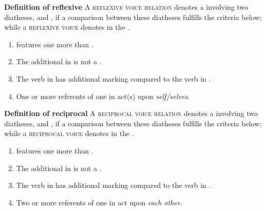 \eanoraggedright
		\textbf{Definition of reflexive} \newline
		A \textsc{reflexive voice relation} denotes a  involving two diatheses,  and , if a comparison between these diatheses fulfills the criteria below; while a \textsc{reflexive voice} denotes  in the .
		\begin{enumerate}[label=\roman*)]
			\item {} features one  more than .
			\item The additional  in  is not a .
			\item The verb in  has additional marking compared to the verb in .
			\item One or more referents of one  in  act(s) upon \textit{self/selves}.
		\end{enumerate}
	\z

\eanoraggedright
		\textbf{Definition of reciprocal} \newline
		A \textsc{reciprocal voice relation} denotes a  involving two diatheses,  and , if a comparison between these diatheses fulfills the criteria below; while a \textsc{reciprocal voice} denotes  in the .
		\begin{enumerate}[label=\roman*)]
			\item {} features one  more than .
			\item The additional  in  is not a .
			\item The verb in  has additional marking compared to the verb in .
			\item Two or more referents of one  in  act upon \textit{each other}.
		\end{enumerate}
\z


